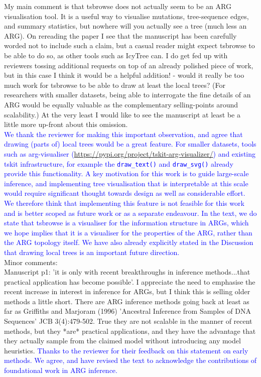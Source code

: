 \documentclass{letter}
\begin{document}
\begin{letter}{}
My main comment is that tsbrowse does not actually seem to be an ARG visualisation tool. It is a useful way 
to visualise mutations, tree-sequence edges, and summary statistics, but nowhere will you actually see a tree 
(much less an ARG). On rereading the paper I see that the manuscript has been carefully worded not to include 
such a claim, but a casual reader might expect tsbrowse to be able to do so, as other tools such as IcyTree can. 
I do get fed up with reviewers tossing additional requests on top of an already polished piece of work, but 
in this case I think it would be a helpful addition! - would it really be too much work for tsbrowse to be 
able to draw at least the local trees? (For researchers with smaller datasets, being able to interrogate the 
fine details of an ARG would be equally valuable as the complementary selling-points around scalability.) At 
the very least I would like to see the manuscript at least be a little more up-front about this omission.\\

\textcolor{blue}{We thank the reviewer for making this important observation, and agree that drawing 
(parts of) local trees would be a great feature. For smaller datasets, tools such as arg-visualiser 
(\url{https://pypi.org/project/tskit-arg-visualizer/}) and existing tskit infrastructure, for example 
the \texttt{draw\_text()} and \texttt{draw\_svg()} already provide this functionality. A key 
motivation for this work is to guide large-scale inference, and implementing tree visualisation that is interpretable 
at this scale would require significant thought towards design as well as considerable effort. We therefore 
think that implementing this feature is not feasible for this work and is better scoped as future work or as 
a separate endeavour. In the text, we do state that tsbrowse is a visualiser for the information structure 
in ARGs, which we hope implies that it is a visualiser for the properties of the ARG, rather than the ARG 
topology itself. We have also already explicitly stated in the Discussion that drawing local trees is an 
important future direction.}\\

Minor comments:\\

Manuscript p1: 'it is only with recent breakthroughs in inference methods...that practical application 
has become possible'. I appreciate the need to emphasise the recent increase in interest in inference for ARGs, 
but I think this is selling older methods a little short. There are ARG inference methods going back at least 
as far as Griffiths and Marjoram (1996) 'Ancestral Inference from Samples of DNA Sequences' JCB 3(4):479-502. 
True they are not scalable in the manner of recent methods, but they *are* practical applications, and they have 
the advantage that they actually sample from the claimed model without introducing any model heuristics.
\textcolor{blue}{Thanks to the reviewer for their feedback on this statement on early methods. We agree, 
and have revised the text to acknowledge the contributions of foundational work in ARG inference.}


\end{letter}
\end{document}
